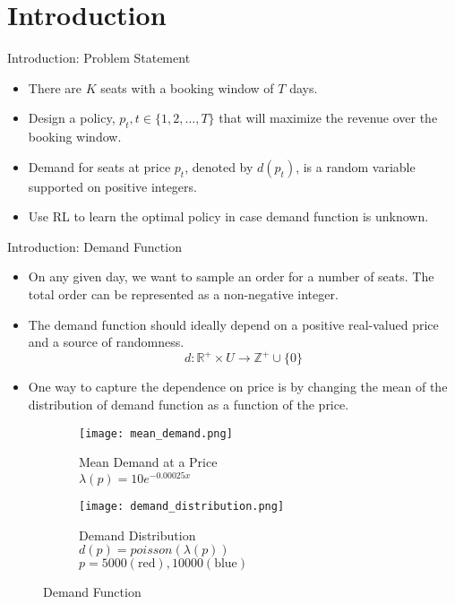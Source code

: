 \section{Introduction}

\begin{frame}{Introduction: Problem Statement}
\begin{itemize}
    \setlength\itemsep{1.5em}
    \item There are $K$ seats with a booking window of $T$ days.
    \item Design a policy, $p_t, t \in \{1, 2, \ldots, T\}$ that will maximize the revenue over the booking window.
    \item Demand for seats at price $p_t$, denoted by $d(p_t)$, is a random variable supported on positive integers.
    \item Use RL to learn the optimal policy in case demand function is unknown.
\end{itemize}
\end{frame}

\begin{frame}{Introduction: Demand Function}
\begin{itemize}
    \item On any given day, we want to sample an order for a number of seats. The total order can be represented as a non-negative integer.
    \item The demand function should ideally depend on a positive real-valued price and a source of randomness.
    $$d: \mathbb{R}^+ \times U \rightarrow \mathbb{Z}^+ \cup \{0\}$$
    \item One way to capture the dependence on price is by changing the mean of the distribution of demand function as a function of the price.
\end{itemize}
\begin{figure}
    \centering
    \hfill
    \begin{subfigure}[t]{0.475\textwidth}
        \centering
        \texttt{[image: mean\_demand.png]}
        \caption{Mean Demand at a Price \\ $\lambda(p) = 10e^{-0.00025x}$}
    \end{subfigure}
    \hfill
    \begin{subfigure}[t]{0.475\textwidth}
        \centering
        \texttt{[image: demand\_distribution.png]}
        \caption{Demand Distribution \\ $d(p)=poisson(\lambda(p))$ \\ $p=5000 (\text{red}), 10000 (\text{blue})$}
    \end{subfigure}
    \hfill
    \caption{Demand Function}
\end{figure}
\end{frame}

